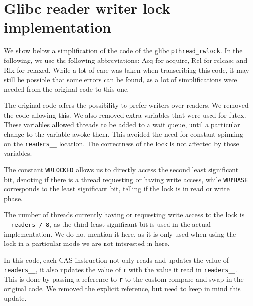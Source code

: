 \chapter{Glibc reader writer lock implementation}
\label{app:glibc}
We show below a simplification of the code of the glibc \texttt{pthread\_rwlock}\cite{glibcRW}. In the following, we use the following abbreviations: Acq for acquire, Rel for release and Rlx for relaxed. While a lot of care was taken when transcribing this code, it may still be possible that some errors can be found, as a lot of simplifications were needed from the original code to this one.

The original code offers the possibility to prefer writers over readers. We removed the code allowing this. We also removed extra variables that were used for futex. These variables allowed threads to be added to a wait queue, until a particular change to the variable awoke them. This avoided the need for constant spinning on the \texttt{readers\_\_} location. The correctness of the lock is not affected by those variables. %

The constant \texttt{WRLOCKED} allows us to directly access the second least significant bit, denoting if there is a thread requesting or having write access, while \texttt{WRPHASE} corresponds to the least significant bit, telling if the lock is in read or write phase.

The number of threads currently having or requesting write access to the lock is \texttt{\_\_readers / 8}, as the third least significant bit is used in the actual implementation. We do not mention it here, as it is only used when using the lock in a particular mode we are not interested in here. 

In this code, each CAS instruction not only reads and updates the value of \texttt{readers\_\_}, it also updates the value of \texttt{r} with the value it read in \texttt{readers\_\_}. This is done by passing a reference to \texttt{r} to the custom compare and swap in the original code. We removed the explicit reference, but need to keep in mind this update.

